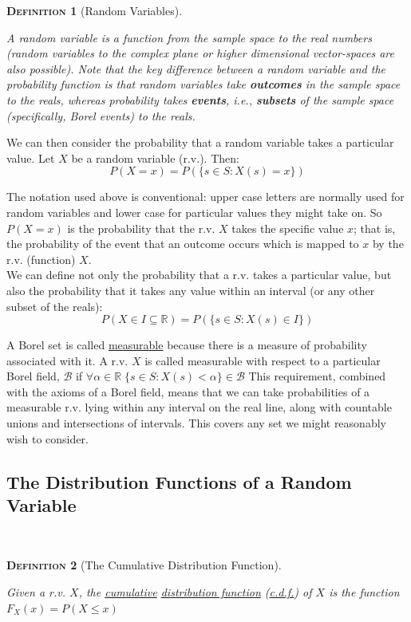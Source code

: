 \documentclass[12pt,a4paper]{article}
\newtheorem{definition}{\textsc{Definition}}[section]
\begin{document}
\begin{definition}[Random Variables]$\;$\par
\vspace{1cm}

A random variable is a function from the sample space to the real numbers (random variables to the complex plane or higher dimensional vector-spaces are also possible). Note that the key difference between a random variable and the probability function is that random variables take {\bf outcomes} in the sample space to the reals, whereas probability takes {\bf events}, i.e., {\bf subsets} of the sample space (specifically, Borel events) to the reals.
\end{definition}

We can then consider the probability that a random variable takes a particular value. Let $X$ be a random variable (r.v.). Then:
$$P(X = x) = P(\{s \in S : X(s) = x\})$$

The notation used above is conventional: upper case letters are normally used for random variables and lower case for particular values they might take on. So $P(X = x)$ is the probability that the r.v. $X$ takes the specific value $x$; that is, the probability of the event that an outcome occurs which is mapped to $x$ by the r.v. (function) $X$.\\
\indent We can define not only the probability that a r.v. takes a particular value, but also the probability that it takes any value within an interval (or any other subset of the reals):
$$P(X \in I \subseteq \mathbb{R}) = P(\{s \in S : X(s) \in I\})$$

A Borel set is called \underline{measurable} because there is a measure of probability associated with it. A r.v. $X$ is called measurable with respect to a particular Borel field, $\mathcal{B}$ if $\forall \alpha \in \mathbb{R} \; \{s \in S : X(s) < \alpha\} \in \mathcal{B}$ This requirement, combined with the axioms of a Borel field, means that we can take probabilities of a measurable r.v. lying within any interval on the real line, along with countable unions and intersections of intervals. This covers any set we might reasonably wish to consider.

\subsection{The Distribution Functions of a Random Variable}$\;$

\begin{definition}[The Cumulative Distribution Function]$\;$\par
\vspace{1cm}

Given a r.v. $X$, the \underline{cumulative} \underline{distribution function} (\underline{c.d.f.}) of $X$ is the function $F_X(x) = P(X \leq x)$
\end{definition}
\end{document}
